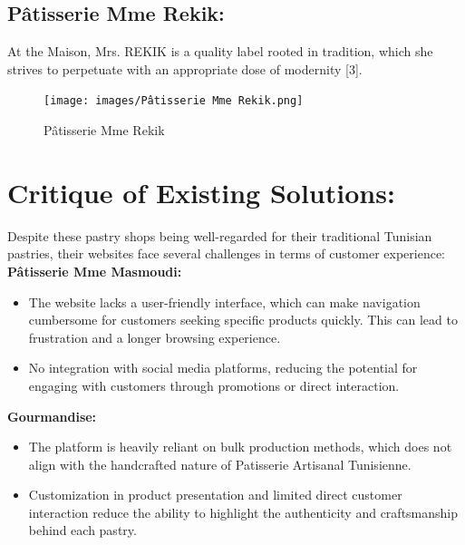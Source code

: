 \subsection{Pâtisserie Mme Rekik:}

At the Maison, Mrs. REKIK is a quality label rooted in tradition, which she strives to perpetuate with an appropriate dose of modernity [3].

\begin{figure}[!h]
\begin{center}
\texttt{[image: images/Pâtisserie Mme Rekik.png]}
\end{center}
\caption{Pâtisserie Mme Rekik}
\end{figure}

\newpage
\section{Critique of Existing Solutions:}

Despite these pastry shops being well-regarded for their traditional Tunisian pastries, their websites face several challenges in terms of customer experience:\\


\textbf{Pâtisserie Mme Masmoudi:}\\

\begin{itemize}[label=\textbullet]
    \item The website lacks a user-friendly interface, which can make navigation cumbersome for customers seeking specific products quickly. This can lead to frustration and a longer browsing experience.
    \item No integration with social media platforms, reducing the potential for engaging with customers through promotions or direct interaction.\\
\end{itemize}

\textbf{Gourmandise:}\\

\begin{itemize}[label=\textbullet]
    \item The platform is heavily reliant on bulk production methods, which does not align with the handcrafted nature of Patisserie Artisanal Tunisienne.
    \item Customization in product presentation and limited direct customer interaction reduce the ability to highlight the authenticity and craftsmanship behind each pastry.\\
\end{itemize}

